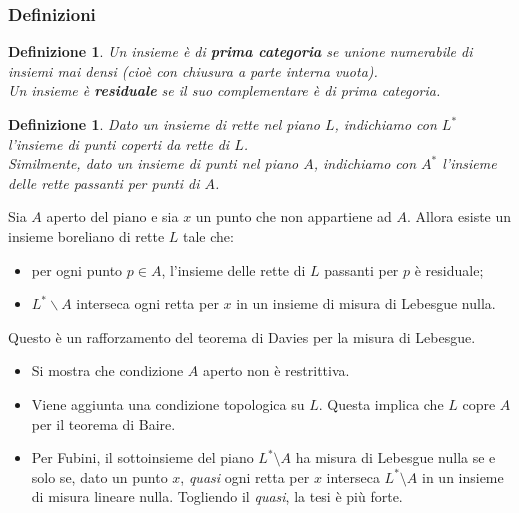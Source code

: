 \documentclass[11pt]{beamer} %
\newcommand{\<}{\langle}
\renewcommand{\>}{\rangle}
\theoremstyle{theorem}
\theoremstyle{theorem}
\theoremstyle{theorem}
\theoremstyle{theorem}
\newtheorem{defin}[teo]{Definizione}
\theoremstyle{theorem}
\begin{document}
	

\begin{frame}[fragile]
	\frametitle{Definizioni}

	\begin{defin}
	Un insieme è di \textbf{prima categoria} se unione numerabile di insiemi mai densi (cioè con chiusura a parte interna vuota).\\ \pause
	Un insieme è \textbf{residuale} se il suo complementare è di prima categoria. 
	\end{defin}
	\pause
	\begin{defin}
	Dato un insieme di rette nel piano $L$, indichiamo con $L^*$ l'insieme di punti coperti da rette di $L$.\\
	\pause
	Similmente, dato un insieme di punti nel piano $A$, indichiamo con $A^*$ l'insieme delle rette passanti per punti di $A$.
	\end{defin}

\end{frame}

\begin{frame}[fragile]

\begin{lemma}[1]
	Sia $A$ aperto del piano e sia $x$ un punto che non appartiene ad $A$. Allora esiste un insieme boreliano di rette $L$ tale che:\\
	\begin{itemize}
		\item per ogni punto $p \in A$, l'insieme delle rette di $L$ passanti per $p$ è residuale;
		\item $L^{*} \backslash A$ interseca ogni retta per $x$ in un insieme di misura di Lebesgue nulla.\\
	\end{itemize}
\end{lemma}
	\pause
	Questo è un rafforzamento del teorema di Davies per la misura di Lebesgue.\\
	\pause
	\begin{itemize}
		\item Si mostra che condizione $A$ aperto non è restrittiva.\\
		\pause
		\item Viene aggiunta una condizione topologica su $L$. Questa implica che $L$ copre $A$ per il teorema di Baire.\\
		\pause
		\item Per Fubini, il sottoinsieme del piano $L^* \setminus A$ ha misura di Lebesgue nulla se e solo se, dato un punto $x$, \emph{quasi} ogni retta per $x$ interseca $L^* \setminus A$ in un insieme di misura lineare nulla. Togliendo il \emph{quasi}, la tesi è più forte.\\
	\end{itemize}

\end{frame}
\end{document}
